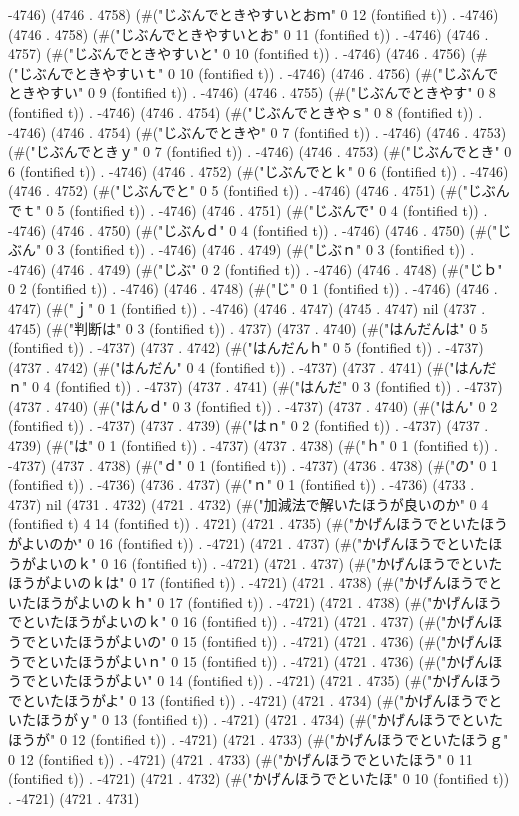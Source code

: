 -4746) (4746 . 4758) (#("じぶんでときやすいとおｍ" 0 12 (fontified t)) . -4746) (4746 . 4758) (#("じぶんでときやすいとお" 0 11 (fontified t)) . -4746) (4746 . 4757) (#("じぶんでときやすいと" 0 10 (fontified t)) . -4746) (4746 . 4756) (#("じぶんでときやすいｔ" 0 10 (fontified t)) . -4746) (4746 . 4756) (#("じぶんでときやすい" 0 9 (fontified t)) . -4746) (4746 . 4755) (#("じぶんでときやす" 0 8 (fontified t)) . -4746) (4746 . 4754) (#("じぶんでときやｓ" 0 8 (fontified t)) . -4746) (4746 . 4754) (#("じぶんでときや" 0 7 (fontified t)) . -4746) (4746 . 4753) (#("じぶんでときｙ" 0 7 (fontified t)) . -4746) (4746 . 4753) (#("じぶんでとき" 0 6 (fontified t)) . -4746) (4746 . 4752) (#("じぶんでとｋ" 0 6 (fontified t)) . -4746) (4746 . 4752) (#("じぶんでと" 0 5 (fontified t)) . -4746) (4746 . 4751) (#("じぶんでｔ" 0 5 (fontified t)) . -4746) (4746 . 4751) (#("じぶんで" 0 4 (fontified t)) . -4746) (4746 . 4750) (#("じぶんｄ" 0 4 (fontified t)) . -4746) (4746 . 4750) (#("じぶん" 0 3 (fontified t)) . -4746) (4746 . 4749) (#("じぶｎ" 0 3 (fontified t)) . -4746) (4746 . 4749) (#("じぶ" 0 2 (fontified t)) . -4746) (4746 . 4748) (#("じｂ" 0 2 (fontified t)) . -4746) (4746 . 4748) (#("じ" 0 1 (fontified t)) . -4746) (4746 . 4747) (#("ｊ" 0 1 (fontified t)) . -4746) (4746 . 4747) (4745 . 4747) nil (4737 . 4745) (#("判断は" 0 3 (fontified t)) . 4737) (4737 . 4740) (#("はんだんは" 0 5 (fontified t)) . -4737) (4737 . 4742) (#("はんだんｈ" 0 5 (fontified t)) . -4737) (4737 . 4742) (#("はんだん" 0 4 (fontified t)) . -4737) (4737 . 4741) (#("はんだｎ" 0 4 (fontified t)) . -4737) (4737 . 4741) (#("はんだ" 0 3 (fontified t)) . -4737) (4737 . 4740) (#("はんｄ" 0 3 (fontified t)) . -4737) (4737 . 4740) (#("はん" 0 2 (fontified t)) . -4737) (4737 . 4739) (#("はｎ" 0 2 (fontified t)) . -4737) (4737 . 4739) (#("は" 0 1 (fontified t)) . -4737) (4737 . 4738) (#("ｈ" 0 1 (fontified t)) . -4737) (4737 . 4738) (#("ｄ" 0 1 (fontified t)) . -4737) (4736 . 4738) (#("の" 0 1 (fontified t)) . -4736) (4736 . 4737) (#("ｎ" 0 1 (fontified t)) . -4736) (4733 . 4737) nil (4731 . 4732) (4721 . 4732) (#("加減法で解いたほうが良いのか" 0 4 (fontified t) 4 14 (fontified t)) . 4721) (4721 . 4735) (#("かげんほうでといたほうがよいのか" 0 16 (fontified t)) . -4721) (4721 . 4737) (#("かげんほうでといたほうがよいのｋ" 0 16 (fontified t)) . -4721) (4721 . 4737) (#("かげんほうでといたほうがよいのｋは" 0 17 (fontified t)) . -4721) (4721 . 4738) (#("かげんほうでといたほうがよいのｋｈ" 0 17 (fontified t)) . -4721) (4721 . 4738) (#("かげんほうでといたほうがよいのｋ" 0 16 (fontified t)) . -4721) (4721 . 4737) (#("かげんほうでといたほうがよいの" 0 15 (fontified t)) . -4721) (4721 . 4736) (#("かげんほうでといたほうがよいｎ" 0 15 (fontified t)) . -4721) (4721 . 4736) (#("かげんほうでといたほうがよい" 0 14 (fontified t)) . -4721) (4721 . 4735) (#("かげんほうでといたほうがよ" 0 13 (fontified t)) . -4721) (4721 . 4734) (#("かげんほうでといたほうがｙ" 0 13 (fontified t)) . -4721) (4721 . 4734) (#("かげんほうでといたほうが" 0 12 (fontified t)) . -4721) (4721 . 4733) (#("かげんほうでといたほうｇ" 0 12 (fontified t)) . -4721) (4721 . 4733) (#("かげんほうでといたほう" 0 11 (fontified t)) . -4721) (4721 . 4732) (#("かげんほうでといたほ" 0 10 (fontified t)) . -4721) (4721 . 4731) 